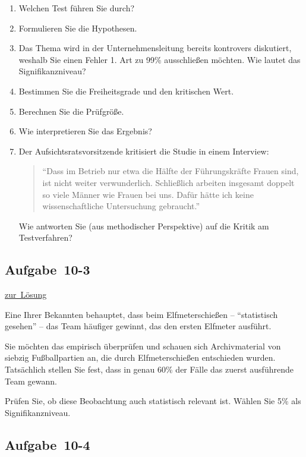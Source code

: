 \documentclass[
  11pt,
  ngerman,
  a4paper,
]{report}
\begin{document}
\begin{enumerate}
\def\labelenumi{\alph{enumi})}
\item
  Welchen Test führen Sie durch?
\item
  Formulieren Sie die Hypothesen.
\item
  Das Thema wird in der Unternehmensleitung bereits kontrovers diskutiert, weshalb Sie einen Fehler 1. Art zu 99\% ausschließen möchten. Wie lautet das Signifikanzniveau?
\item
  Bestimmen Sie die Freiheitsgrade und den kritischen Wert.
\item
  Berechnen Sie die Prüfgröße.
\item
  Wie interpretieren Sie das Ergebnis?
\item
  Der Aufsichtsratsvorsitzende kritisiert die Studie in einem Interview:

  \begin{quote}
  \enquote{Dass im Betrieb nur etwa die Hälfte der Führungskräfte Frauen sind, ist nicht weiter verwunderlich. Schließlich arbeiten insgesamt doppelt so viele Männer wie Frauen bei uns. Dafür hätte ich keine wissenschaftliche Untersuchung gebraucht.}
  \end{quote}

  Wie antworten Sie (aus methodischer Perspektive) auf die Kritik am Testverfahren?
\end{enumerate}

\hypertarget{aufgabe-10-3}{%
\subsection{Aufgabe~10-3}\label{aufgabe-10-3}}

\protect\hyperlink{loesung-10-3}{zur~Lösung}

Eine Ihrer Bekannten behauptet, dass beim Elfmeterschießen -- \enquote{statistisch gesehen} -- das Team häufiger gewinnt, das den ersten Elfmeter ausführt.

Sie möchten das empirisch überprüfen und schauen sich Archivmaterial von siebzig Fußballpartien an, die durch Elfmeterschießen entschieden wurden. Tatsächlich stellen Sie fest, dass in genau 60\% der Fälle das zuerst ausführende Team gewann.

Prüfen Sie, ob diese Beobachtung auch statistisch relevant ist. Wählen Sie 5\% als Signifikanzniveau.

\hypertarget{aufgabe-10-4}{%
\subsection{Aufgabe~10-4}\label{aufgabe-10-4}}
\end{document}

